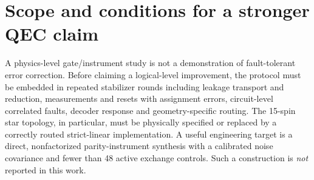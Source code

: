 \documentclass[aps,prx,onecolumn,10pt]{revtex4-2}
\begin{document}
\section{Scope and conditions for a stronger QEC claim}
A physics-level gate/instrument study is not a demonstration of fault-tolerant error correction. Before claiming a logical-level improvement, the protocol must be embedded in repeated stabilizer rounds including leakage transport and reduction, measurements and resets with assignment errors, circuit-level correlated faults, decoder response and geometry-specific routing. The 15-spin star topology, in particular, must be physically specified or replaced by a correctly routed strict-linear implementation. A useful engineering target is a direct, nonfactorized parity-instrument synthesis with a calibrated noise covariance and fewer than 48 active exchange controls. Such a construction is \emph{not} reported in this work.
\end{document}
